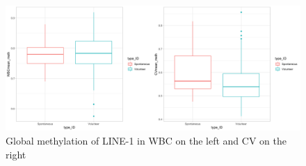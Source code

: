 \documentclass[journal,article,submit,moreauthors,pdftex]{Definitions/mdpi}
\begin{document}
\begin{table}[H]
\caption{Global LINE-1 methylation level: Mean and standard deviation (SD) for WBC and CV in RPL and VTP.}
\centering
{}
\label{tab:methylation level}
\end{table}

\begin{figure}[H]
    \centering
    \includegraphics[width=16 cm]{Definitions/Global_methylation_pannello.png}
    \caption{Global methylation of LINE-1 in WBC on the left and CV on the right}
    \label{fig:Global methylation}
\end{figure}
\end{document}
